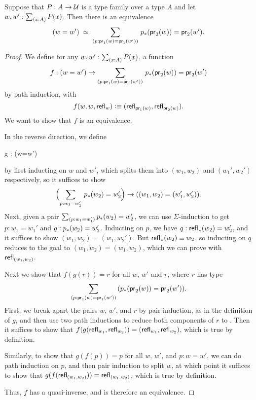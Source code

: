 \begin{thm}\label{thm:path-sigma}
Suppose that $P:A\to\mathcal{U}$ is a type family over a type $A$ and let $w,w':\sm{x:A}P(x)$. Then there is an equivalence
\begin{equation*}
\eqvspaced{(w=w')}{\dsm{p:\proj{1}(w)=\proj{1}(w')} \trans{p}{\proj{2}(w)}=\proj{2}(w')}.
\end{equation*}
\end{thm}

\begin{proof}
We define for any $w,w':\sm{x:A}P(x)$, a function
\begin{equation*}
f: (w=w') \to \dsm{p:\proj{1}(w)=\proj{1}(w')} \trans{p}{\proj{2}(w)}=\proj{2}(w')
\end{equation*}
by path induction, with
\begin{equation*}
f(w,w,\mathsf{refl}_{w})\vcentcolon\equiv(\mathsf{refl}_{\mathsf{pr}_{1}(w)},\mathsf{refl}_{\mathsf{pr}_{2}(w)}).
\end{equation*}
We want to show that $f$ is an equivalence.

In the reverse direction, we define
\begin{narrowmultline*}
  g :  
      \to
      \narrowbreak
      (w=w')
\end{narrowmultline*}
by first inducting on $w$ and $w'$, which splits them into $(w_1,w_2)$ and
$(w_1',w_2')$ respectively, so it suffices to show 
\begin{equation*}
\Parens{\sm{p:w_1 = w_1'}\trans{p}{w_2}=w_2'} \to ((w_1,w_2)=(w_1',w_2')).
\end{equation*}
Next, given a pair $\sm{p:w_1 = w_1'}\trans{p}{w_2}=w_2'$, we can
use $\Sigma$-induction to get $p : w_1 = w_1'$ and $q :
{p}_{*}\mathopen{}\left({w_2}\right)\mathclose{}=w_2'$.  Inducting on $p$, we have $q :
{\mathsf{refl}_{}}_{*}\mathopen{}\left({w_2}\right)\mathclose{}=w_2'$, and it suffices to show 
$(w_1,w_2)=(w_1,w_2')$.  But ${\mathsf{refl}_{}}_{*}\mathopen{}\left({w_2}\right)\mathclose{} \equiv w_2$, so
inducting on $q$ reduces to the goal to 
$(w_1,w_2)=(w_1,w_2)$, which we can prove with $\mathsf{refl}_{(w_1,w_2)}$.  

Next we show that $f(g(r))=r$ for all $w$, $w'$ and
$r$, where $r$ has type
\[\dsm{p:\proj{1}(w)=\proj{1}(w')} (\trans{p}{\proj{2}(w)}=\proj{2}(w')).\]
First, we break apart the pairs $w$, $w'$, and $r$ by pair induction, as in the
definition of $g$, and then use two path inductions to reduce both components
of $r$ to .  Then it suffices to show that 
$f (g(\mathsf{refl}_{w_1},\mathsf{refl}_{w_2})) = (\mathsf{refl}_{w_1},\mathsf{refl}_{w_2})$, which is true by definition.

Similarly, to show that $g(f(p))=p$ for all $w$, $w'$,
and $p : w = w'$, we can do path induction on $p$, and then pair induction to
split $w$, at which point it suffices to show that
$g(f (\mathsf{refl}_{(w_1,w_2)})) = \mathsf{refl}_{(w_1,w_2)}$, which is true by
definition.

Thus, $f$ has a quasi-inverse, and is therefore an equivalence.  
\end{proof}

